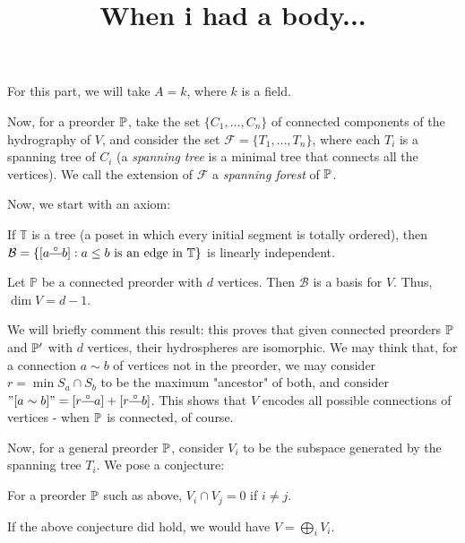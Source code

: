 
\title{When i had a body...}

	\maketitle
	\par For this part, we will take $A = k$, where $k$ is a field.
	\begin{definition}
		 Now, for a preorder $\mathbb{P}$, take the set $\{C_1, \dots, C_n\}$ of connected components of the hydrography of $V$, and consider the set $\mathcal{F} = \{T_1, \dots, T_n\}$, where each $T_i$ is a spanning tree of $C_i$ (a \textit{spanning tree} is a minimal tree that connects all the vertices).  We call the extension of $\mathcal{F}$ a \textit{spanning forest} of $\mathbb{P}$.
	\end{definition}
	Now, we start with an axiom:
	\begin{mata}
		If $\mathbb{T}$ is a tree (a poset in which every initial segment is totally ordered), then $\mathcal{B} = \{[a \connect b]: a \leq b \text{ is an edge in } \mathbb{T}\}$ is linearly independent.
	\end{mata}

	\begin{cor}
		Let $\mathbb{P}$ be a connected preorder with $d$ vertices. Then $\mathcal{B}$ is a basis for $V$. Thus, $\dim V = d - 1$.
	\end{cor}
	\par We will briefly comment this result: this proves that given connected preorders $\mathbb{P}$ and $\mathbb{P}'$ with $d$ vertices, their hydrospheres are isomorphic. We may think that, for a connection $a \sim b$ of vertices not in the preorder, we may consider $r = \min S_a \cap S_b$ to be the maximum "ancestor" of both, and consider $"[a \sim b]" = [r \connect a] + [r \connect b]$. This shows that $V$ encodes all possible connections of vertices - when $\mathbb{P}$ is connected, of course.
	\par Now, for a general preorder $\mathbb{P}$, consider $V_i$ to be the subspace generated by the spanning tree $T_i$. We pose a conjecture:
	\begin{conj}
		For a preorder $\mathbb{P}$ such as above, $V_i \cap V_j = 0$ if $i \neq j$.
	\end{conj}
	If the above conjecture did hold, we would have $V = \bigoplus_i V_i$.


